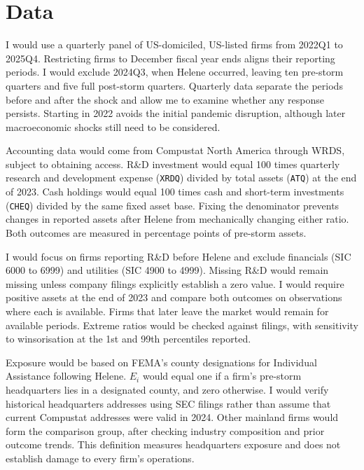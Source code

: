 \section*{Data}

I would use a quarterly panel of US-domiciled, US-listed firms from 2022Q1 to 2025Q4. Restricting firms to December fiscal year ends aligns their reporting periods. I would exclude 2024Q3, when Helene occurred, leaving ten pre-storm quarters and five full post-storm quarters. Quarterly data separate the periods before and after the shock and allow me to examine whether any response persists. Starting in 2022 avoids the initial pandemic disruption, although later macroeconomic shocks still need to be considered.

Accounting data would come from Compustat North America through WRDS, subject to obtaining access. R\&D investment would equal 100 times quarterly research and development expense (\texttt{XRDQ}) divided by total assets (\texttt{ATQ}) at the end of 2023. Cash holdings would equal 100 times cash and short-term investments (\texttt{CHEQ}) divided by the same fixed asset base. Fixing the denominator prevents changes in reported assets after Helene from mechanically changing either ratio. Both outcomes are measured in percentage points of pre-storm assets.

I would focus on firms reporting R\&D before Helene and exclude financials (SIC 6000 to 6999) and utilities (SIC 4900 to 4999). Missing R\&D would remain missing unless company filings explicitly establish a zero value. I would require positive assets at the end of 2023 and compare both outcomes on observations where each is available. Firms that later leave the market would remain for available periods. Extreme ratios would be checked against filings, with sensitivity to winsorisation at the 1st and 99th percentiles reported.

Exposure would be based on FEMA's county designations for Individual Assistance following Helene. $E_i$ would equal one if a firm's pre-storm headquarters lies in a designated county, and zero otherwise. I would verify historical headquarters addresses using SEC filings rather than assume that current Compustat addresses were valid in 2024. Other mainland firms would form the comparison group, after checking industry composition and prior outcome trends. This definition measures headquarters exposure and does not establish damage to every firm's operations.
